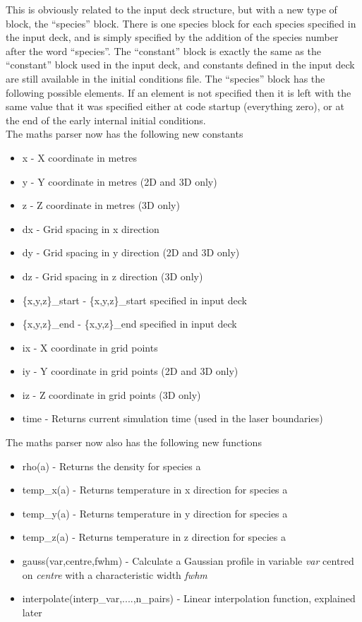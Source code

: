 \documentclass[12pt,a4paper]{article}
\begin{document}
This is obviously related to the input deck structure, but with a new type of
block, the ``species'' block. There is one species block for each species
specified in the input deck, and is simply specified by the addition of the
species number after the word ``species''. The ``constant'' block is exactly
the same as the ``constant'' block used in the input deck, and constants
defined in the input deck are still available in the initial conditions
file. The ``species'' block has the following possible elements. If an element
is not specified then it is left with the same value that it was specified
either at code startup (everything zero), or at the end of the early internal
initial conditions.\\
The maths parser now has the following new constants
\begin{itemize}
\item x - X coordinate in metres
\item y - Y coordinate in metres (2D and 3D only)
\item z - Z coordinate in metres (3D only)
\item dx - Grid spacing in x direction
\item dy - Grid spacing in y direction (2D and 3D only)
\item dz - Grid spacing in z direction (3D only)
\item \{x,y,z\}\_start - \{x,y,z\}\_start specified in input deck
\item \{x,y,z\}\_end - \{x,y,z\}\_end specified in input deck
\item ix - X coordinate in grid points
\item iy - Y coordinate in grid points (2D and 3D only)
\item iz - Z coordinate in grid points (3D only)
\item time - Returns current simulation time (used in the laser boundaries)
\end{itemize}

The maths parser now also has the following new functions
\begin{itemize}
\item rho(a) - Returns the density for species a
\item temp\_x(a) - Returns temperature in x direction for species a
\item temp\_y(a) - Returns temperature in y direction for species a
\item temp\_z(a) - Returns temperature in z direction for species a
\item gauss(var,centre,fwhm) - Calculate a Gaussian profile in variable {\it
    var} centred on {\it centre} with a characteristic width {\it fwhm}
\item interpolate(interp\_var,....,n\_pairs) - Linear interpolation function,
  explained later
\end{itemize}
\end{document}
